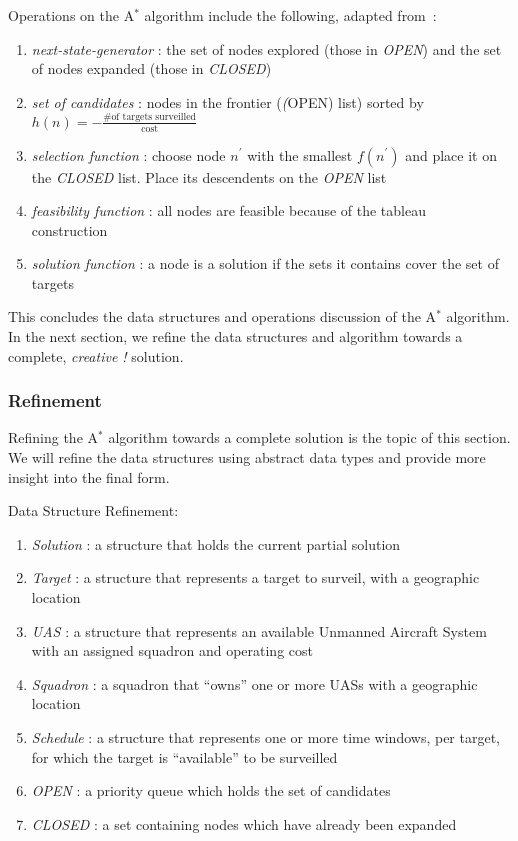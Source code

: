 \documentclass[conference]{IEEEtran}
\newcommand{\heuristic}{${h(n) = -\frac{\text{\# of targets
surveilled}}{\text{cost}}}$}
\begin{document}
Operations on the A$^*$ algorithm include the following, adapted
from~\cite{lamontAstarEx}:

\begin{enumerate}
  \item[] \emph{next-state-generator} : the set of nodes explored (those in
    \emph{OPEN}) and the set of nodes expanded (those in \emph{CLOSED})
  \item[] \emph{set of candidates} : nodes in the frontier (\emph(OPEN) list)
    sorted by \heuristic
  \item[] \emph{selection function} : choose node $n^\prime$ with the smallest
    $f(n^\prime)$ and place it on the \emph{CLOSED} list. Place its descendents
    on the \emph{OPEN} list
  \item[] \emph{feasibility function} : all nodes are feasible because of the
    tableau construction~\cite{christofides1975}
  \item[] \emph{solution function} : a node is a solution if the sets it
    contains cover the set of targets
\end{enumerate}

This concludes the data structures and operations discussion of the A$^*$
algorithm. In the next section, we refine the data structures and algorithm
towards a complete, \emph{creative !} solution.

\subsubsection{Refinement}

Refining the A$^*$ algorithm towards a complete solution is the topic of this
section. We will refine the data structures using abstract data types and
provide more insight into the final form.

Data Structure Refinement:
\begin{enumerate}
  \item[] \emph{Solution} : a structure that holds the current partial solution
  \item[] \emph{Target} : a structure that represents a target to surveil, with
    a geographic location
  \item[] \emph{UAS} : a structure that represents an available Unmanned
    Aircraft System with an assigned squadron and operating cost
  \item[] \emph{Squadron} : a squadron that ``owns'' one or more UASs with a
    geographic location
  \item[] \emph{Schedule} : a structure that represents one or more time
    windows, per target, for which the target is ``available'' to be surveilled
  \item[] \emph{OPEN} : a priority queue which holds the set of candidates
  \item[] \emph{CLOSED} : a set containing nodes which have already been
    expanded
\end{enumerate}
\end{document}
